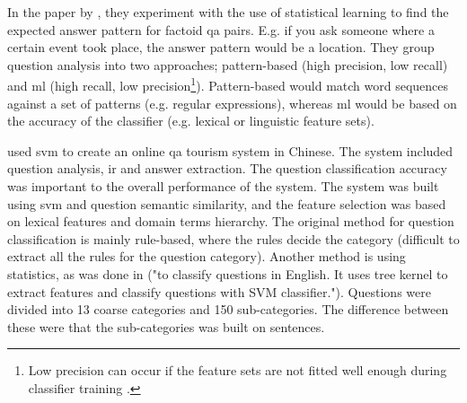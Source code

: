 In the paper by \citet{TobaAdrianiManurung2011}, they experiment with the use of statistical learning to find the expected answer pattern for factoid \gls{qa} pairs. 
E.g. if you ask someone where a certain event took place, the answer pattern would be a location. 
They group question analysis into two approaches; pattern-based (high precision, low recall) and \gls{ml} (high recall, 
low precision\footnote{
	Low precision can occur if the feature sets are not fitted well enough during classifier training 
	\cite[p.~283]{TobaAdrianiManurung2011}.
	}). 
Pattern-based would match word sequences against a set of patterns (e.g. regular expressions), whereas \gls{ml} would be based on the accuracy of the classifier 
(e.g. lexical or linguistic feature sets). 
\begin{comment}
The retrieval of \gls{qa} pairs is done by using a statistical relation framework: Bayesian Analogical Reasoning (BAR). 
Features sets are then extracted from the training set by use of binary values checking if the question contains a given question word. 
The BAR framework then learns the related features and computes the estimation for them. 
Thereafter \gls{qa} pairs are retrieved from the testing set and compared against the training set. 
Afterwards, the \gls{qa} pairs that have identical question words are identified, and overlapping pairs are grouped according their named entity group.

To retrieve named entities, they used two different recognizers. 
The first was Stanford (extracts the person, organization and location), and the second was dictionary based (extract number entities and fine-grained noun-based entities). 

Question words were extracted by building a question word list from the training set (achieved by using Stanford Part-of-Speech (POS) tagger). 
Then for each question, look for the appearance of the question word to create the feature set.

Mapped named-entities; e.g. ORGANIZATION became NEorganization.
\end{comment}

\citet{XuZhouWang2012} used \gls{svm} to create an online \gls{qa} tourism system in Chinese. 
The system included question analysis, \gls{ir} and answer extraction. 
The question classification accuracy was important to the overall performance of the system. 
The system was built using \gls{svm} and question semantic similarity, and the feature selection was based on lexical features and domain terms hierarchy. 
The original method for question classification is mainly rule-based, where the rules decide the category (difficult to extract all the rules for the question category). 
Another method is using statistics, as was done in \cite{ZhangLee2003} ("to classify questions in English. It uses tree kernel to extract features and classify questions with SVM classifier."). 
Questions were divided into 13 coarse categories and 150 sub-categories. 
The difference between these were that the sub-categories was built on sentences.

